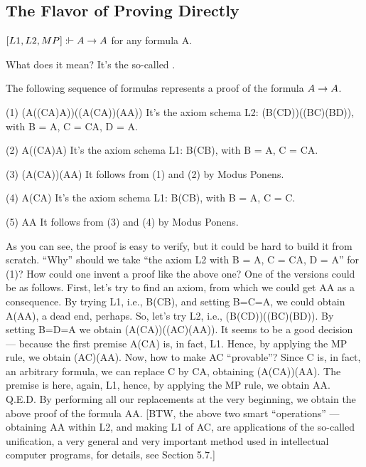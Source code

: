 \subsection{The Flavor of Proving Directly}

\begin{theorem}
\([L1, L2, MP]: \vdash A\rightarrow A\) for any formula A.
\end{theorem}

What does it mean? It's the so-called .

The following sequence of formulas represents a proof of the formula \(A\rightarrow A\).

(1) (A\IMPLIES ((C\IMPLIES A)\IMPLIES A))\IMPLIES ((A\IMPLIES (C\IMPLIES A))\IMPLIES (A\IMPLIES A)) It's the axiom schema L2: (B\IMPLIES (C\IMPLIES D))\IMPLIES ((B\IMPLIES C)\IMPLIES (B\IMPLIES D)), with B = A, C = C\IMPLIES A, D = A.

(2) A\IMPLIES ((C\IMPLIES A)\IMPLIES A) It's the axiom schema L1: B\IMPLIES (C\IMPLIES B), with B = A, C = C\IMPLIES A.

(3) (A\IMPLIES (C\IMPLIES A))\IMPLIES (A\IMPLIES A) It follows from (1) and (2) by Modus Ponens.

(4) A\IMPLIES (C\IMPLIES A) It's the axiom schema L1: B\IMPLIES (C\IMPLIES B), with B = A, C = C.

(5) A\IMPLIES A It follows from (3) and (4) by Modus Ponens.

As you can see, the proof is easy to verify, but it could be hard to build it from scratch.
``Why'' should we take ``the axiom L2 with B = A, C = C\IMPLIES A, D = A'' for (1)?
How could one invent a proof like the above one? One of the versions could be as follows.
First, let's try to find an axiom, from which we could get A\IMPLIES A as a consequence.
By trying L1, i.e., B\IMPLIES (C\IMPLIES B), and setting B=C=A, we could obtain A\IMPLIES (A\IMPLIES A), a dead end, perhaps.
So, let's try L2, i.e., (B\IMPLIES (C\IMPLIES D))\IMPLIES ((B\IMPLIES C)\IMPLIES (B\IMPLIES D)).
By setting B=D=A we obtain (A\IMPLIES (C\IMPLIES A))\IMPLIES ((A\IMPLIES C)\IMPLIES (A\IMPLIES A)).
It seems to be a good decision --- because the first premise A\IMPLIES (C\IMPLIES A) is, in fact, L1.
Hence, by applying the MP rule, we obtain (A\IMPLIES C)\IMPLIES (A\IMPLIES A).
Now, how to make A\IMPLIES C ``provable''? Since C is, in fact, an arbitrary formula, we can replace C by C\IMPLIES A, obtaining (A\IMPLIES (C\IMPLIES A))\IMPLIES (A\IMPLIES A).
The premise is here, again, L1, hence, by applying the MP rule, we obtain A\IMPLIES A. Q.E.D.
By performing all our replacements at the very beginning, we obtain the above proof of the formula A\IMPLIES A.
[BTW, the above two smart ``operations'' --- obtaining A\IMPLIES A within L2, and making L1 of A\IMPLIES C, are applications of the so-called unification, a very general and very important method used in intellectual computer programs, for details, see Section 5.7.]

